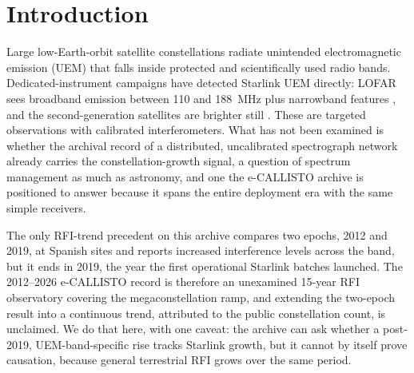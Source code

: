 \documentclass[twocolumn]{aastex631}
\newcommand{\code}[1]{\texttt{#1}}
\begin{document}
\begin{abstract}
(\rfRealNRising\ rising, \rfRealNFalling\ falling; \code{coherent\_rise}=\rfRealCoherent) is
consistent with per-station and local-RFI effects dominating. The null carries its measured
sensitivity: injecting a common Starlink-shaped rise into both committed series, the coherence
criterion reaches 90\% power only at \rfRealAmpNinety\ log-units, larger than the largest
excursion in the data, so a modest common signal would not have been detected. The
positive pooled slope survives equalising the station month counts
(\rfRealEqualNSlope\ [\rfRealEqualNLo, \rfRealEqualNHi] per year), so it is dominated by
HUMAIN's step amplitude, not its month count. We claim no Starlink attribution and report the
validated burst-immune metric, the notch-robust self-normalizing line test, the
pipeline-generated coherence verdict with its power curve, and the per-station systematics
accounting.
\end{abstract}


\section{Introduction}
Large low-Earth-orbit satellite constellations radiate unintended electromagnetic emission (UEM)
that falls inside protected and scientifically used radio bands. Dedicated-instrument campaigns
have detected Starlink UEM directly: LOFAR sees broadband emission between 110 and 188~MHz plus
narrowband features \citep{divruno2023}, and the second-generation satellites are brighter still
\citep{bassa2024}. These are targeted observations with calibrated interferometers. What has not
been examined is whether the archival record of a distributed, uncalibrated spectrograph
network already carries the constellation-growth signal, a question of spectrum management as
much as astronomy, and one the e-CALLISTO archive is positioned to answer because it spans
the entire deployment era with the same simple receivers.

The only RFI-trend precedent on this archive \citep{prieto2020} compares two epochs, 2012 and 2019,
at Spanish sites and reports increased interference levels across the band, but
it ends in 2019, the year the first operational Starlink batches launched. The 2012--2026
e-CALLISTO record is therefore an unexamined 15-year RFI observatory covering the megaconstellation
ramp, and extending the two-epoch result into a continuous trend, attributed to the public
constellation count, is unclaimed. We do that here, with one caveat: the archive can ask whether
a post-2019, UEM-band-specific rise tracks Starlink growth, but it cannot by itself prove
causation, because general terrestrial RFI grows over the same period.
\end{document}
